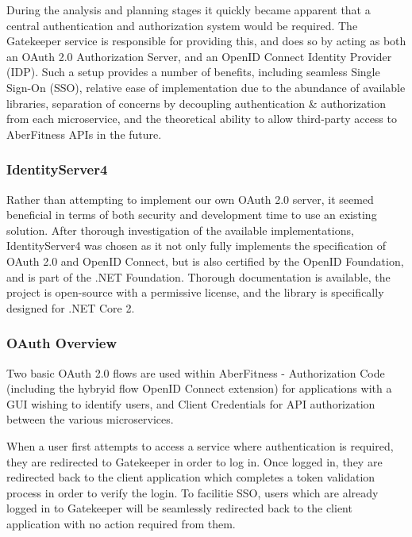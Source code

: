 During the analysis and planning stages it quickly became apparent that a central authentication and authorization system would be required.  The Gatekeeper service is responsible for providing this, and does so by acting as both an OAuth 2.0 Authorization Server, and an OpenID Connect Identity Provider (IDP).  Such a setup provides a number of benefits, including seamless Single Sign-On (SSO), relative ease of implementation due to the abundance of available libraries, separation of concerns by decoupling authentication \& authorization from each microservice, and the theoretical ability to allow third-party access to AberFitness APIs in the future.

\subsubsection{IdentityServer4}

Rather than attempting to implement our own OAuth 2.0 server, it seemed beneficial in terms of both security and development time to use an existing solution.  After thorough investigation of the available implementations, IdentityServer4\cite{identityserver4} was chosen as it not only fully implements the specification of OAuth 2.0 and OpenID Connect, but is also certified by the OpenID Foundation, and is part of the .NET Foundation\cite{identityserver4docs}.  Thorough documentation is available, the project is open-source with a permissive license, and the library is specifically designed for .NET Core 2.

\subsubsection{OAuth Overview}

Two basic OAuth 2.0 flows are used within AberFitness - Authorization Code (including the hybryid flow OpenID Connect extension) for applications with a GUI wishing to identify users, and Client Credentials for API authorization between the various microservices.

When a user first attempts to access a service where authentication is required, they are redirected to Gatekeeper in order to log in.  Once logged in, they are redirected back to the client application which completes a token validation process in order to verify the login.  To facilitie SSO, users which are already logged in to Gatekeeper will be seamlessly redirected back to the client application with no action required from them.


